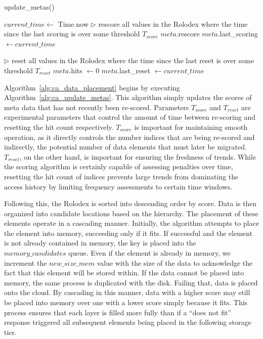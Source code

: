 \begin{algorithm}[htp]
	\small
	\caption{\label{alg:ca_update_metas}update\_metas()}
	\begin{algorithmic}[1]
	\STATE $current\_time \leftarrow$ Time.now
	\STATE $\triangleright$ rescore all values in the Rolodex where the time
	since the last scoring is over some threshold $T_{score}$
			\STATE $meta$.rescore
			\STATE $meta$.last\_scoring $\leftarrow current\_time$
		\ENDIF
	\ENDFOR
	
	\STATE $\triangleright$ reset all values in the Rolodex where the time
	since the last reset is over some threshold $T_{reset}$
			\STATE $meta$.hits $\leftarrow 0$
			\STATE $meta$.last\_reset $\leftarrow current\_time$
		\ENDIF
	\ENDFOR
\end{algorithmic}
\end{algorithm}

Algorithm~\ref{alg:ca_data_placement} begins by executing
Algorithm~\ref{alg:ca_update_metas}. This algorithm simply updates the scores
of meta data that has not recently been re-scored. Parameters $T_{score}$ and
$T_{reset}$ are experimental parameters that control the amount of time between
re-scoring and resetting the hit count respectively. $T_{score}$ is important for
maintaining smooth operation, as it directly controls the number indices
that are being re-scored and indirectly, the potential number of data elements
that must later be migrated. $T_{reset}$, on the other hand, is important for
ensuring the freshness of trends. While the scoring algorithm is certainly
capable of assessing penalties over time, resetting the hit count of indices
prevents large trends from dominating the access history by limiting frequency
assessments to certain time windows.

Following this, the Rolodex is sorted into descending order by score. Data is
then organized into candidate locations based on the hierarchy. The placement
of these elements operate in a cascading manner. Initially, the algorithm
attempts to place the element into memory, succeeding only if it fits. If
successful and the element is not already contained in memory, the key is
placed into the $memory\_candidates$ queue. Even if the element is already in
memory, we increment the $new\_size\_mem$ value with the size of the data to
acknowledge the fact that this element will be stored within. If the data
cannot be placed into memory, the same process is duplicated with the disk.
Failing that, data is placed onto the cloud. By cascading in this manner, data
with a higher score may still be placed into memory over one with a lower score
simply because it fits. This process ensures that each layer is filled more
fully than if a ``does not fit'' response triggered all subsequent elements
being placed in the following storage tier.

